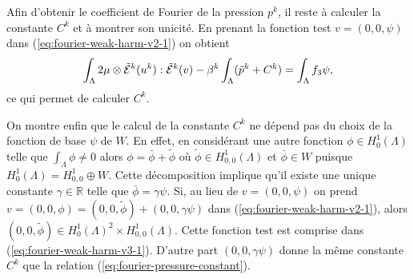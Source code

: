 Afin d'obtenir le coefficient de Fourier de la pression $p^k$, il
reste à calculer la constante $C^k$ et à montrer son unicité. En
prenant la fonction test $v = (0,0,\psi)$ dans
(\ref{eq:fourier-weak-harm-v2-1}) on obtient
\begin{align}
\int_\Lambda 2\mu\otimes
\tilde{\mathcal E}^k(u^k):\tilde{\mathcal E}^k(v) -
\beta^k\int_\Lambda (\tilde p^k + C^k) = \int_\Lambda f_3 \psi, \label{eq:fourier-pressure-constant}
\end{align}
ce qui permet de calculer $C^k$.

On montre enfin que le calcul de la constante $C^k$ ne dépend pas du
choix de la fonction de base $\psi$ de $W$. En effet, en considérant
une autre fonction $\phi \in H^1_0(\Lambda)$ telle que $\int_\Lambda
\phi \neq 0$ alors $\phi = \bar\phi + \tilde \phi$ où $\tilde \phi \in
H^1_{0,0}(\Lambda)$ et $\bar \phi \in W$ puisque $H^1_0(\Lambda) =
H^1_{0,0} \oplus W$. Cette décomposition implique qu'il existe une
unique constante $\gamma \in \mathbb R$ telle que $\bar \phi = \gamma
\psi$. Si, au lieu de $v = (0,0,\psi)$ on prend $v = (0,0,\phi) =
(0,0,\tilde \phi) + (0,0,\gamma \psi)$ dans
(\ref{eq:fourier-weak-harm-v2-1}), alors $(0,0,\tilde \phi) \in
H^1_0(\Lambda)^2\times H^1_{0,0}(\Lambda)$. Cette fonction test est
comprise dans (\ref{eq:fourier-weak-harm-v3-1}). D'autre part
$(0,0,\gamma \psi)$ donne la même constante $C^k$ que la relation
(\ref{eq:fourier-pressure-constant}).

